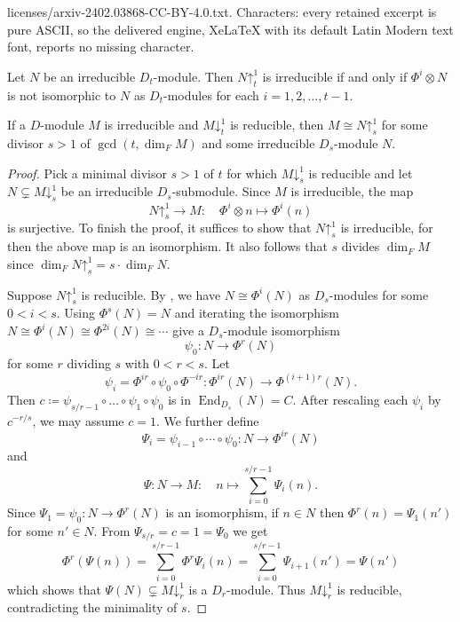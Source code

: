 \documentclass[10pt,a4paper]{amsart}
\DeclareMathOperator{\End}{End}
\newcommand{\pda}{\mathord{\downarrow}}
\newcommand{\pua}{\mathord{\uparrow}}
\begin{document}
licenses/arxiv-2402.03868-CC-BY-4.0.txt. Characters: every retained excerpt is pure ASCII, so the delivered engine, XeLaTeX with its default Latin Modern text font, reports no missing character.
\begin{theorem}
\label{thm:mackey-irreducibility-criterion}
    Let $N$ be an irreducible $D_t$-module. Then $N\pua^{1}_{t}$ is irreducible if and only if $\Phi^i\otimes N$ is not isomorphic to $N$ as $D_t$-modules for each $i=1,2,\dots,t-1$. 
\end{theorem}

\begin{theorem}
\label{thm:absolute-irreducibility}
If a $D$-module $M$ is irreducible and $M\pda^{1}_{t}$ is reducible,
then $M \cong N\pua^{1}_{s}$ for some divisor $s>1$ of $\gcd(t,\dim_FM)$ and some irreducible $D_{s}$-module $N$.
\end{theorem}

\begin{proof}
Pick a minimal divisor $s>1$ of $t$ for which $M\pda^{1}_{s}$ is reducible and 
let $N\subsetneq M\pda^{1}_{s}$ be an irreducible $D_{s}$-submodule.
Since $M$ is irreducible, the map 
\[
    N\pua^{1}_{s}\to M\colon \quad \Phi^{i}\otimes n\mapsto \Phi^{i}(n)
\]
is surjective. 
To finish the proof, it suffices to show that $N\pua^{1}_{s}$ is irreducible, for then the above map is an isomorphism. It also follows that $s$ divides $\dim_{F}M$ since $\dim_{F}N\pua^{1}_{s}=s\cdot\dim_{F}N$.

Suppose $N\pua^{1}_{s}$ is reducible. 
By , 
we have $N\cong \Phi^{i}(N)$ as $D_{s}$-modules for some $0 < i < s$. Using $\Phi^s(N)=N$ and iterating the isomorphism $N\cong \Phi^{i}(N) \cong \Phi^{2i}(N)\cong \cdots$ give a $D_{s}$-module isomorphism 
\[
    \psi_{0}\colon N\to \Phi^{r}(N)
\]
for some $r$ dividing $s$ with $0<r<s$. 
Let 
\[
    \psi_i=\Phi^{ir}\circ\psi_0\circ\Phi^{-ir} \colon \Phi^{ir}(N) \rightarrow \Phi^{(i+1)r}(N).
\]
Then $c\coloneqq\psi_{s/r-1}\circ\ldots\circ\psi_{1}\circ\psi_0$ is in $\End_{D_{s}}(N) = C$. 
After rescaling each $\psi_i$ by ${c}^{-r/s}$, we may assume $c=1$. We further define 
\[
    \Psi_i = \psi_{i-1}\circ\cdots\circ\psi_0 \colon N \to \Phi^{ir}(N)
\]
and
\[
\Psi\colon N \to M\colon \quad n\mapsto \sum_{i=0}^{s/r-1} \Psi_i(n).
\]
Since $\Psi_1 =\psi_0\colon N\to \Phi^{r}(N)$ is an isomorphism, 
if $n\in N$ then $\Phi^r(n)=\Psi_1(n')$
for some $n'\in N$. 
From $\Psi_{s/r}=c=1=\Psi_{0}$ we get
\[
    \Phi^r\left(\Psi(n)\right) =  \sum_{i=0}^{s/r-1} \Phi^r \Psi_i(n) = \sum_{i=0}^{s/r-1} \Psi_{i+1}(n') = \Psi(n')
\]
which shows that $\Psi(N) \subsetneq M\pda^1_r$ is a $D_r$-module. 
Thus $M\pda^1_r$ is reducible, contradicting the minimality of $s$.
\end{proof}
\end{document}
